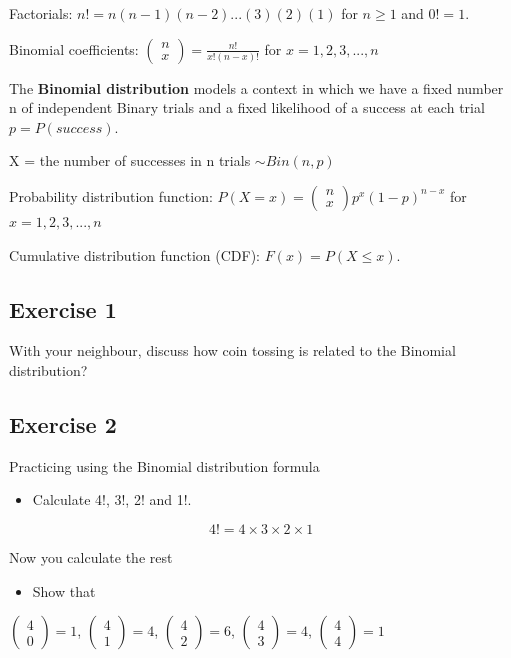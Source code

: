 \documentclass[
  10pt,
  letterpaper,
  DIV=11,
  numbers=noendperiod]{scrartcl}
\providecommand{\tightlist}{%
  \setlength{\itemsep}{0pt}\setlength{\parskip}{0pt}}\usepackage{longtable,booktabs,array}
\begin{document}
Factorials: \(n! = n(n - 1)(n - 2)...(3)(2)(1)\) for \(n \ge 1\) and
\(0! = 1\).

Binomial coefficients:
\(\left(\begin{matrix}n\\x\end{matrix}\right)=\frac{n!}{x!(n-x)!}\) for
\(x=1,2,3,...,n\)

The \textbf{Binomial distribution} models a context in which we have a
fixed number n of independent Binary trials and a fixed likelihood of a
success at each trial \(p = P(success)\).

X = the number of successes in n trials \(\sim Bin(n,p)\)

Probability distribution function:
\(P(X = x) = \left(\begin{matrix}n\\x\end{matrix}\right)p^x(1-p)^{n-x}\)
for \(x=1,2,3,...,n\)

Cumulative distribution function (CDF): \(F(x) = P(X \le x)\).

\subsection{Exercise 1}\label{exercise-1}

With your neighbour, discuss how coin tossing is related to the Binomial
distribution?

\subsection{Exercise 2}\label{exercise-2}

Practicing using the Binomial distribution formula

\begin{itemize}
\tightlist
\item
  Calculate 4!, 3!, 2! and 1!.
\end{itemize}

\[4!=4 \times 3 \times 2 \times 1\]

Now you calculate the rest

\begin{itemize}
\tightlist
\item
  Show that
\end{itemize}

\(\left(\begin{matrix}4\\0\end{matrix}\right)=1\),
\(\left(\begin{matrix}4\\1\end{matrix}\right)=4\),
\(\left(\begin{matrix}4\\2\end{matrix}\right)=6\),
\(\left(\begin{matrix}4\\3\end{matrix}\right)=4\),
\(\left(\begin{matrix}4\\4\end{matrix}\right)=1\)
\end{document}
